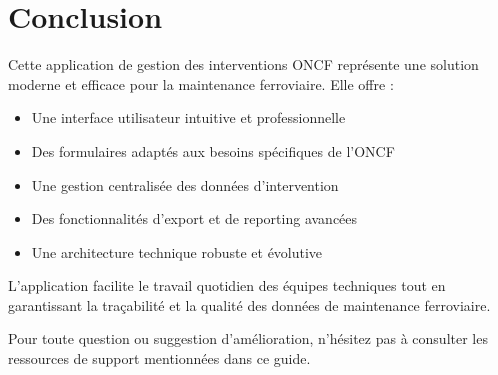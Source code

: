 \documentclass[12pt,a4paper]{report}
\begin{document}
\chapter{Conclusion}

Cette application de gestion des interventions ONCF représente une solution moderne et efficace pour la maintenance ferroviaire. Elle offre :

\begin{itemize}
    \item Une interface utilisateur intuitive et professionnelle
    \item Des formulaires adaptés aux besoins spécifiques de l'ONCF
    \item Une gestion centralisée des données d'intervention
    \item Des fonctionnalités d'export et de reporting avancées
    \item Une architecture technique robuste et évolutive
\end{itemize}

L'application facilite le travail quotidien des équipes techniques tout en garantissant la traçabilité et la qualité des données de maintenance ferroviaire.

Pour toute question ou suggestion d'amélioration, n'hésitez pas à consulter les ressources de support mentionnées dans ce guide.
\end{document}
